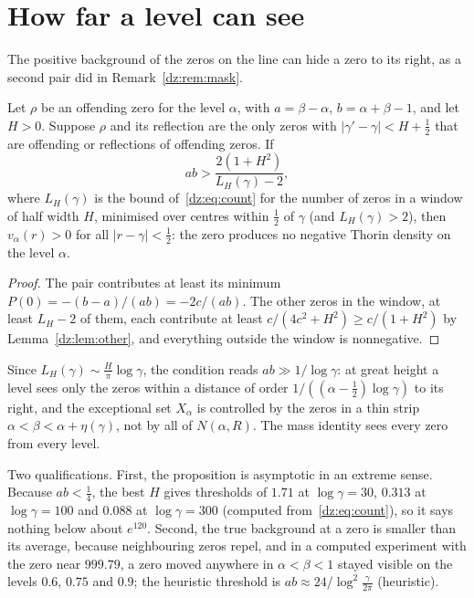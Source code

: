 \section{How far a level can see}\label{dz:sec:res}
The positive background of the zeros on the line can hide a zero to its right, as a second pair did in Remark~\ref{dz:rem:mask}.
\begin{proposition}\label{dz:prop:res}
Let $\rho$ be an offending zero for the level $\alpha$, with $a=\beta-\alpha$, $b=\alpha+\beta-1$, and let $H>0$. Suppose $\rho$ and its reflection are the only zeros with $|\gamma'-\gamma|<H+\frac12$ that are offending or reflections of offending zeros. If
\[
ab>\frac{2(1+H^2)}{L_H(\gamma)-2},
\]
where $L_H(\gamma)$ is the bound of~\eqref{dz:eq:count} for the number of zeros in a window of half width $H$, minimised over centres within $\frac12$ of $\gamma$ (and $L_H(\gamma)>2$), then $v_\alpha(r)>0$ for all $|r-\gamma|<\frac12$: the zero produces no negative Thorin density on the level $\alpha$.
\end{proposition}
\begin{proof}
The pair contributes at least its minimum $P(0)=-(b-a)/(ab)=-2c/(ab)$. The other zeros in the window, at least $L_H-2$ of them, each contribute at least $c/(4c^2+H^2)\ge c/(1+H^2)$ by Lemma~\ref{dz:lem:other}, and everything outside the window is nonnegative.
\end{proof}
Since $L_H(\gamma)\sim\frac H\pi\log\gamma$, the condition reads $ab\gg1/\log\gamma$: at great height a level sees only the zeros within a distance of order $1/((\alpha-\frac12)\log\gamma)$ to its right, and the exceptional set $X_\alpha$ is controlled by the zeros in a thin strip $\alpha<\beta<\alpha+\eta(\gamma)$, not by all of $N(\alpha,R)$. The mass identity sees every zero from every level.

Two qualifications. First, the proposition is asymptotic in an extreme sense. Because $ab<\frac14$, the best $H$ gives thresholds of $1.71$ at $\log\gamma=30$, $0.313$ at $\log\gamma=100$ and $0.088$ at $\log\gamma=300$ (computed from~\eqref{dz:eq:count}), so it says nothing below about $e^{120}$. Second, the true background at a zero is smaller than its average, because neighbouring zeros repel, and in a computed experiment with the zero near $999.79$, a zero moved anywhere in $\alpha<\beta<1$ stayed visible on the levels $0.6$, $0.75$ and $0.9$; the heuristic threshold is $ab\approx24/\log^2\frac\gamma{2\pi}$ (heuristic).

